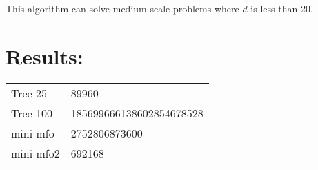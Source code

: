 \documentclass[11pt]{article}
\begin{document}
	\bigskip
	
	This algorithm can solve medium scale problems where $d$ is less than 20.
	
	
	
	\section*{Results:}
	
	\begin{tabular} { l l }
		
		Tree 25 &89960\\
		
		Tree 100 &185699666138602854678528\\
		
		mini-mfo &2752806873600\\
		
		mini-mfo2 &692168\\
	\end{tabular}
	
	
	
\end{document}
